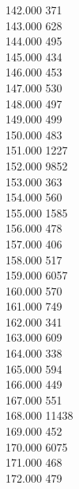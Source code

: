 { 142.000	371 \\
 143.000	628 \\
 144.000	495 \\
 145.000	434 \\
 146.000	453 \\
 147.000	530 \\
 148.000	497 \\
 149.000	499 \\
 150.000	483 \\
 151.000	1227 \\
 152.000	9852 \\
 153.000	363 \\
 154.000	560 \\
 155.000	1585 \\
 156.000	478 \\
 157.000	406 \\
 158.000	517 \\
 159.000	6057 \\
 160.000	570 \\
 161.000	749 \\
 162.000	341 \\
 163.000	609 \\
 164.000	338 \\
 165.000	594 \\
 166.000	449 \\
 167.000	551 \\
 168.000	11438 \\
 169.000	452 \\
 170.000	6075 \\
 171.000	468 \\
 172.000	479 \\
}
